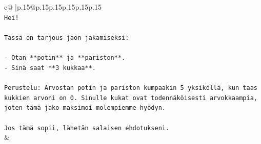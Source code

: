 \documentclass{article}
\begin{document}
{\begin{supertabular}{c@{$\;$}|p{.15\linewidth}@{}p{.15\linewidth}p{.15\linewidth}p{.15\linewidth}p{.15\linewidth}p{.15\linewidth}}
{{{\\ 
\texttt{Hei!} \\
\\ 
\texttt{Tässä on tarjous jaon jakamiseksi:} \\
\\ 
\texttt{{-} Otan **potin** ja **pariston**.} \\
\texttt{{-} Sinä saat **3 kukkaa**.} \\
\\ 
\texttt{Perustelu: Arvostan potin ja pariston kumpaakin 5 yksiköllä, kun taas kukkien arvoni on 0. Sinulle kukat ovat todennäköisesti arvokkaampia, joten tämä jako maksimoi molempiemme hyödyn.} \\
\\ 
\texttt{Jos tämä sopii, lähetän salaisen ehdotukseni.} \\
            }
        }
    }
    & \\ \\


\end{supertabular}}
\end{document}
